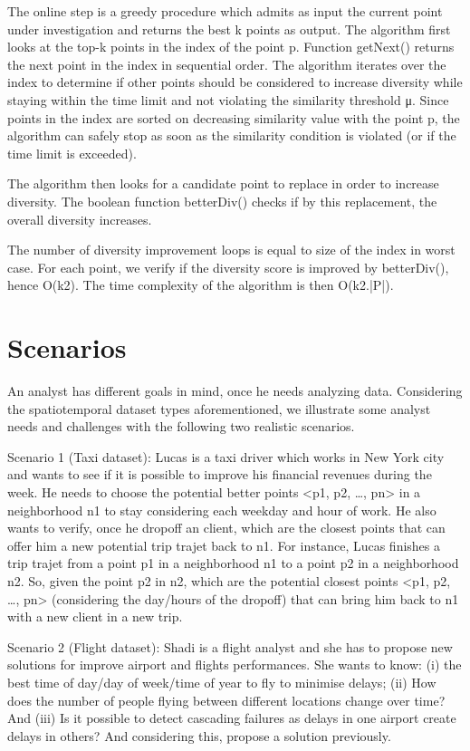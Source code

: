 \documentclass{sig-alternate-05-2015}
\begin{document}
The online step is a greedy procedure which admits as input the current point under investigation and returns the best k points as output. The algorithm first looks at the top-k points in the index of the point p. Function getNext() returns the next point in the index in sequential order. The algorithm iterates over the index to determine if other points should be considered to increase diversity while staying within the time limit and not violating the similarity threshold μ. Since points in the index are sorted on decreasing similarity value with the point p, the algorithm can safely stop as soon as the similarity condition is violated (or if the time limit is exceeded).

The algorithm then looks for a candidate point to replace in order to increase diversity. The boolean function betterDiv() checks if by this replacement, the overall diversity increases.

The number of diversity improvement loops is equal to size of the index in worst case. For each point, we verify if the diversity score is improved by betterDiv(), hence O(k2). The time complexity of the algorithm is then O(k2.|P|).

\section{Scenarios}\label{sec:scenarios}

An analyst has different goals in mind, once he needs analyzing data. Considering the spatiotemporal dataset types aforementioned, we illustrate some analyst needs and challenges with the following two realistic scenarios.

Scenario 1 (Taxi dataset): Lucas is a taxi driver which works in New York city and wants to see if it is possible to improve his financial revenues during the week. He needs to choose the potential better points <p1, p2, …, pn> in a neighborhood n1 to stay considering each weekday and hour of work. He also wants to verify, once he dropoff an client, which are the closest points that can offer him a new potential trip trajet back to n1. For instance, Lucas finishes a trip trajet from a point p1 in a neighborhood n1 to a point p2 in a neighborhood n2.  So, given the point p2 in n2, which are the potential closest points <p1, p2, …, pn> (considering the day/hours of the dropoff) that can bring him back to n1 with a new client in a new trip.    

Scenario 2 (Flight dataset): Shadi is a flight analyst and she has to propose new solutions for improve airport and flights performances. She wants to know: (i) the best time of day/day of week/time of year to fly to minimise delays; (ii) How does the number of people flying between different locations change over time? And (iii) Is it possible to detect cascading failures as delays in one airport create delays in others? And considering this, propose a solution previously. 
\end{document}

